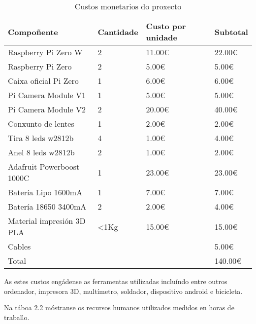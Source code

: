 \begin{table}[tb]
    \label{c:custos hardware}
    \begin{center}
        \begin{tabular}{|l|l|l|l|}
            \hline
             Compoñente & Cantidade & Custo por unidade & Subtotal\\ \hline
             Raspberry Pi Zero W & 2 & 11.00€ & 22.00€ \\ \hline
             Raspberry Pi Zero & 2 & 5.00€ & 5.00€ \\ \hline
             Caixa oficial Pi Zero & 1 & 6.00€ & 6.00€ \\ \hline
             Pi Camera Module V1 & 1 & 5.00€ & 5.00€ \\ \hline
             Pi Camera Module V2 & 2 & 20.00€ & 40.00€ \\ \hline
             Conxunto de lentes & 1 & 2.00€ & 2.00€ \\ \hline
             Tira 8 leds w2812b & 4 & 1.00€ & 4.00€\\ \hline
             Anel 8 leds w2812b & 2 & 1.00€ & 2.00€ \\ \hline
             Adafruit Powerboost 1000C & 1 & 23.00€ & 23.00€ \\ \hline
             Batería Lipo 1600mA & 1 & 7.00€ & 7.00€\\ \hline
             Batería 18650 3400mA & 2 & 2.00€ & 4.00€ \\ \hline
             Material impresión 3D PLA & <1Kg & 15.00€ & 15.00€ \\ \hline
             Cables &  &  & 5.00€ \\ \hline
             Total &  &  & 140.00€ \\ \hline
        \end{tabular}
    \end{center}
    \caption{Custos monetarios do proxecto}
\end{table}

As estes custos engádense as ferramentas utilizadas incluíndo entre outros ordenador, impresora 3D, multímetro, soldador, dispositivo android e bicicleta.

Na táboa 2.2 móstranse os recursos humanos utilizados medidos en horas de traballo.

